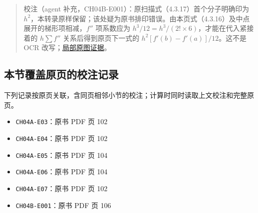 \documentclass[
  10pt,
  fontset=fandol]{ctexart}
\providecommand{\tightlist}{%
  \setlength{\itemsep}{0pt}\setlength{\parskip}{0pt}}
\begin{document}
\begin{quote}
校注（agent 补充，CH04B-E001）：原扫描式（4.3.17）首个分子明确印为 \(h^2\)，本转录原样保留；该处疑为原书排印错误。由本页式（4.3.16）及中点展开的梯形项相减，\(f''\) 项系数应为 \(h^3/12=h^3/(2!\times6)\)，才能在代入紧接着的 \(h\sum f''\) 关系后得到原页下一式的 \(h^2[f'(b)-f'(a)]/12\)。这不是 OCR 改写；\href{../assets/ch04b/review-p106-middle.png}{局部原图证据}。
\end{quote}

\subsection{本节覆盖原页的校注记录}\label{ux672cux8282ux8986ux76d6ux539fux9875ux7684ux6821ux6ce8ux8bb0ux5f55}

下列记录按原页关联，含同页相邻小节的校注；计算时同时读取上文校注和完整原页。

\begin{itemize}
\tightlist
\item
  \texttt{CH04A-E03}：原书 PDF 页 102
\item
  \texttt{CH04A-E04}：原书 PDF 页 102
\item
  \texttt{CH04A-E05}：原书 PDF 页 104
\item
  \texttt{CH04A-E06}：原书 PDF 页 104
\item
  \texttt{CH04A-E07}：原书 PDF 页 102
\item
  \texttt{CH04B-E001}：原书 PDF 页 106
\end{itemize}
\end{document}
